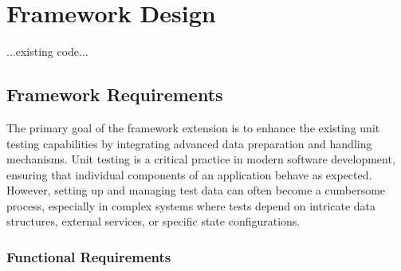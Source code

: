 
\chapter{Framework Design\label{chap:framework_design}}

...existing code...

\section{Framework Requirements}

The primary goal of the framework extension is to
enhance the existing unit testing capabilities by integrating advanced data preparation and handling mechanisms.
Unit testing is a critical practice in modern software development,
ensuring that individual components of an application behave as expected.
However, setting up and managing test data can often become a cumbersome process,
especially in complex systems where tests depend on intricate data structures,
external services, or specific state configurations.
\subsection*{Functional Requirements}

